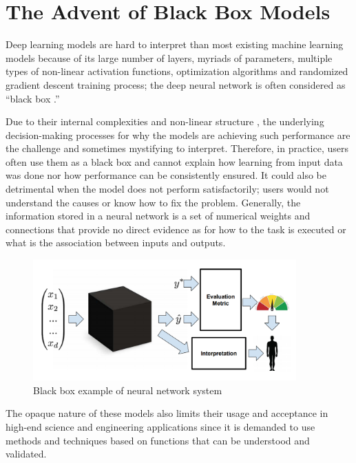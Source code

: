 \section{The Advent of Black Box Models}

Deep learning models are hard to interpret than most existing machine learning models \cite{Kahng2018} because of its large number of layers, myriads of parameters, multiple types of non-linear activation functions, optimization algorithms and randomized gradient descent training process; the deep neural network is often considered as “black box \cite{dlvwz}.”

Due to their internal complexities and non-linear structure \cite{Samek}, the underlying decision-making processes for why the models are achieving such performance are the challenge and sometimes mystifying to interpret. Therefore, in practice, users often use them as a black box and cannot explain how learning from input data was done nor how performance can be consistently ensured. It could also be detrimental when the model does not perform satisfactorily; users would not understand the causes or know how to fix the problem. Generally, the information stored in a neural network is a set of numerical weights and connections that provide no direct evidence as for how to the task is executed or what is the association between inputs and outputs.

\begin{figure}[htbp]
\centering
\includegraphics[width=0.90\textwidth]{images/Black-box.png}
\caption{Black box example of neural network system}
\label{fig:blackbox}
\end{figure}

The opaque nature of these models also limits their usage and acceptance in high-end science and engineering applications since it is demanded to use methods and techniques based on functions that can be understood and validated. 

